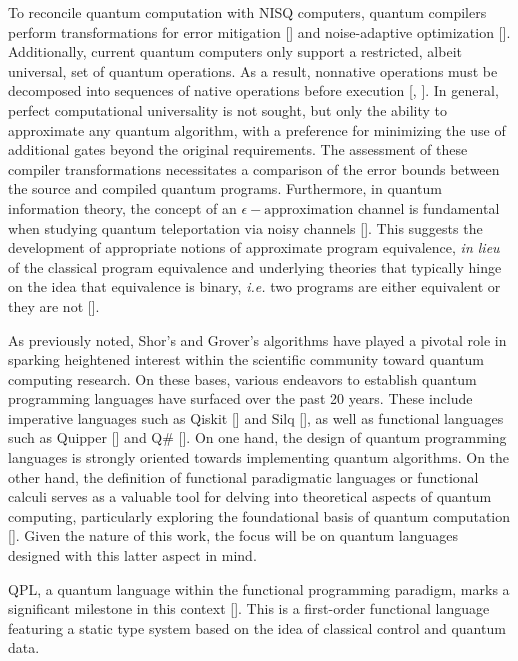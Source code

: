 To reconcile quantum computation with NISQ computers, quantum compilers perform transformations for error mitigation [\cite{wallman2016noise}] and noise-adaptive optimization [\cite{murali2019noise}]. Additionally, current quantum computers only support a restricted, albeit universal, set of quantum operations. As a result, nonnative operations must be decomposed into sequences of native operations before execution [\cite{harrow2002efficient}, \cite{burgholzer2020advanced}]. In general, perfect computational universality is not sought, but only the ability to approximate any quantum algorithm, with a preference for minimizing the use of additional gates beyond the original requirements. The assessment of these compiler transformations necessitates a comparison of the error bounds between the source and compiled quantum programs. Furthermore, in quantum information theory, the concept of an $\epsilon-\text{approximation}$ channel is fundamental when studying quantum teleportation via noisy channels [\cite{watrous2018theory}]. This suggests the development of appropriate notions of approximate program equivalence, \textit {in lieu} of the classical program equivalence and underlying theories that typically hinge on the idea that equivalence is binary, \textit{i.e.} two programs are either equivalent or they are not [\cite{winskel1993formal}].

As previously noted, Shor's and Grover's algorithms have played a pivotal role in sparking heightened interest within the scientific community toward quantum computing research. On these bases, various endeavors to establish quantum programming languages have surfaced over the past 20 years.  These include imperative languages such as Qiskit [\cite{Qiskit}] and Silq [\cite{bichsel2020silq}], as well as functional languages such as Quipper [\cite{green2013quipper}] and Q\# [\cite{svore2018q}]. On one hand, the design of quantum programming languages is strongly oriented towards implementing quantum algorithms. On the other hand, the  definition of functional paradigmatic languages or functional calculi serves as a valuable tool for delving into theoretical aspects of quantum computing, particularly exploring the foundational basis of quantum computation [\cite{zorzi2016quantum}]. Given the nature of this work, the focus will be on quantum languages designed with this latter aspect in mind. 


QPL, a quantum language within the functional programming paradigm, marks a significant milestone in this context [\cite{selinger2004towards}]. This is a first-order functional language featuring a static type system based on the idea of classical control and quantum data.

